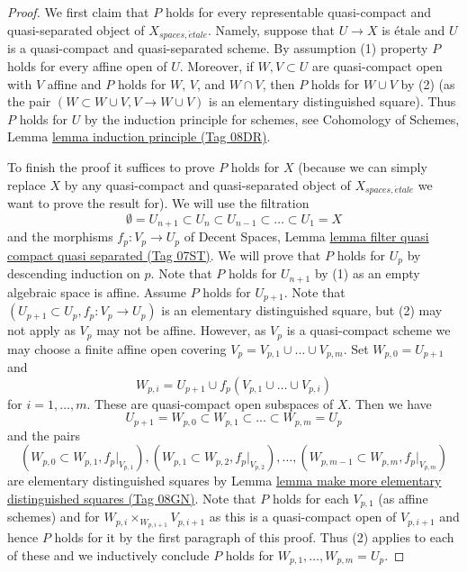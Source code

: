 \documentclass{amsart}
\theoremstyle{plain}
\theoremstyle{definition}
\theoremstyle{remark}
\numberwithin{equation}{subsection}
\def\etale{{\acute{e}tale}}
\begin{document}
\begin{proof}
We first claim that $P$ holds for every representable
quasi-compact and quasi-separated object of $X_{spaces, \etale}$.
Namely, suppose that $U \to X$ is \'etale and $U$ is a
quasi-compact and quasi-separated scheme. By assumption (1)
property $P$ holds for every affine open of $U$. Moreover, if
$W, V \subset U$ are quasi-compact open with $V$ affine and $P$ holds for 
$W$, $V$, and $W \cap V$, then $P$ holds for $W \cup V$ by (2)
(as the pair $(W \subset W \cup V, V \to W \cup V)$ is an elementary
distinguished square). Thus $P$ holds for $U$ by the induction
principle for schemes, see
Cohomology of Schemes, Lemma \href{https://stacks.math.columbia.edu/tag/08DR}{lemma induction principle (Tag 08DR)}.

\medskip\noindent
To finish the proof it suffices to prove $P$ holds for $X$
(because we can simply replace $X$ by any quasi-compact and quasi-separated
object of $X_{spaces, \etale}$ we want to prove the result for).
We will use the filtration
$$
\emptyset = U_{n + 1} \subset
U_n \subset U_{n - 1} \subset \ldots \subset U_1 = X
$$
and the morphisms $f_p : V_p \to U_p$ of
Decent Spaces, Lemma
\href{https://stacks.math.columbia.edu/tag/07ST}{lemma filter quasi compact quasi separated (Tag 07ST)}.
We will prove that $P$ holds for $U_p$ by descending induction on $p$.
Note that $P$ holds for $U_{n + 1}$ by (1)
as an empty algebraic space is affine. Assume $P$ holds for $U_{p + 1}$.
Note that $(U_{p + 1} \subset U_p, f_p : V_p \to U_p)$ is an elementary
distinguished square, but (2) may not apply as $V_p$ may not be affine.
However, as $V_p$ is a quasi-compact scheme we may choose a finite affine open
covering $V_p = V_{p, 1} \cup \ldots \cup V_{p, m}$.
Set $W_{p, 0} = U_{p + 1}$ and
$$
W_{p, i} = U_{p + 1} \cup f_p(V_{p, 1} \cup \ldots \cup V_{p, i})
$$
for $i = 1, \ldots, m$. These are quasi-compact open subspaces of $X$.
Then we have
$$
U_{p + 1} = W_{p, 0} \subset
W_{p, 1} \subset \ldots \subset
W_{p, m} = U_p
$$
and the pairs
$$
(W_{p, 0} \subset W_{p, 1}, f_p|_{V_{p, 1}}),
(W_{p, 1} \subset W_{p, 2}, f_p|_{V_{p, 2}}),\ldots,
(W_{p, m - 1} \subset W_{p, m}, f_p|_{V_{p, m}})
$$
are elementary distinguished squares by
Lemma \href{https://stacks.math.columbia.edu/tag/08GN}{lemma make more elementary distinguished squares (Tag 08GN)}.
Note that $P$ holds for each $V_{p, 1}$ (as affine schemes) and for
$W_{p, i} \times_{W_{p, i + 1}} V_{p, i + 1}$ as this is a quasi-compact
open of $V_{p, i + 1}$ and hence $P$ holds for it by the first paragraph
of this proof. Thus (2) applies to each of these and we inductively
conclude $P$ holds for $W_{p, 1}, \ldots, W_{p, m} = U_p$.
\end{proof}
\end{document}
